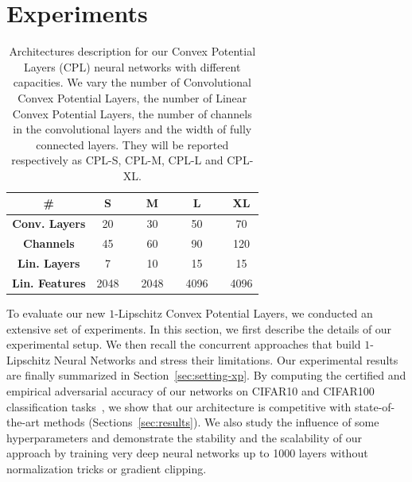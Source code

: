 \section{Experiments}
\label{section:experiments}
\begin{table}
\begin{center}
    \begin{tabular}{cccccccc}
    \toprule
    \textbf{\#} & \textbf{S} &  & \textbf{M} & & \textbf{L} & & \textbf{XL} \\
    \midrule
    \textbf{Conv. Layers}      & 20 & & 30 & & 50& & 70 \\
    \textbf{Channels}  &45 & & 60 & & 90 & & 120 \\ 
    \textbf{Lin. Layers}        &7 & & 10 & & 15 & & 15 \\
    \textbf{Lin. Features} & 2048 & & 2048 & & 4096 & & 4096 \\
    \bottomrule
    \end{tabular}%

\end{center}
\caption{\label{table:model-desc}
Architectures description for our Convex Potential Layers (CPL) neural networks with different capacities. We vary the number of Convolutional Convex Potential Layers, the number of Linear Convex Potential Layers, the number of channels in the convolutional layers and the width of fully
connected layers. They will be reported respectively as CPL-S, CPL-M, CPL-L and CPL-XL.}
\end{table}

To evaluate our new $1$-Lipschitz Convex Potential Layers, we conducted an extensive set of experiments. In this section, we first describe  the details of our experimental setup. We then recall  the concurrent approaches that build $1$-Lipschitz Neural Networks and stress their limitations. Our experimental results are finally summarized in Section~\ref{sec:setting-xp}. By computing the certified and empirical adversarial  accuracy of our networks on CIFAR10 and CIFAR100 classification tasks~\citep{krizhevsky2009learning}, we show that our architecture is competitive with state-of-the-art methods (Sections~\ref{sec:results}). We also study the influence of some hyperparameters and demonstrate the stability and the scalability of our approach by training very deep neural networks up to 1000 layers without normalization tricks or gradient clipping.










